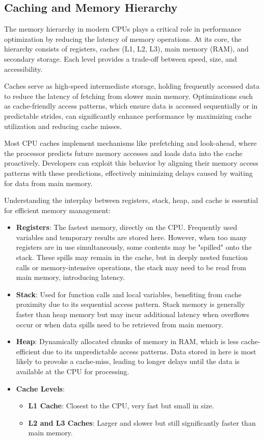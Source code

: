 \documentclass{article}
\begin{document}
\subsection{Caching and Memory Hierarchy}

The memory hierarchy in modern CPUs plays a critical role in performance optimization by reducing the latency of memory operations. At its core, the hierarchy consists of registers, caches (L1, L2, L3), main memory (RAM), and secondary storage. Each level provides a trade-off between speed, size, and accessibility.

Caches serve as high-speed intermediate storage, holding frequently accessed data to reduce the latency of fetching from slower main memory. Optimizations such as cache-friendly access patterns, which ensure data is accessed sequentially or in predictable strides, can significantly enhance performance by maximizing cache utilization and reducing cache misses.

Most CPU caches implement mechanisms like prefetching and look-ahead, where the processor predicts future memory accesses and loads data into the cache proactively. Developers can exploit this behavior by aligning their memory access patterns with these predictions, effectively minimizing delays caused by waiting for data from main memory.

Understanding the interplay between registers, stack, heap, and cache is essential for efficient memory management:
\begin{itemize}
    \item \textbf{Registers}: The fastest memory, directly on the CPU. Frequently used variables and temporary results are stored here. However, when too many registers are in use simultaneously, some contents may be "spilled" onto the stack. These spills may remain in the cache, but in deeply nested function calls or memory-intensive operations, the stack may need to be read from main memory, introducing latency.
    \item \textbf{Stack}: Used for function calls and local variables, benefiting from cache proximity due to its sequential access pattern. Stack memory is generally faster than heap memory but may incur additional latency when overflows occur or when data spills need to be retrieved from main memory.
    \item \textbf{Heap}: Dynamically allocated chunks of memory in RAM, which is less cache-efficient due to its unpredictable access patterns. Data stored in here is most likely to provoke a cache-miss, leading to longer delays until the data is available at the CPU for processing.
    \item \textbf{Cache Levels}: 
    \begin{itemize}
        \item \textbf{L1 Cache}: Closest to the CPU, very fast but small in size.
        \item \textbf{L2 and L3 Caches}: Larger and slower but still significantly faster than main memory.
    \end{itemize}
\end{itemize}
\end{document}
